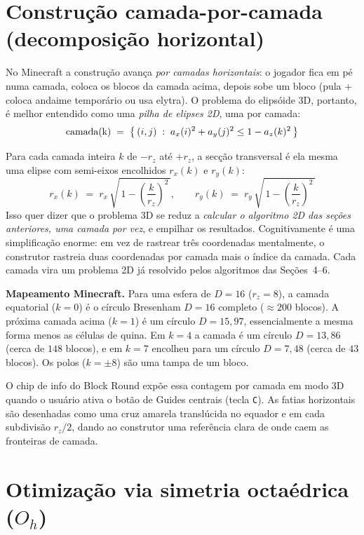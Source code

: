 \documentclass[12pt,a4paper]{scrartcl}
\newcommand{\code}[1]{\texttt{\small #1}}
\begin{document}
\section{Construção camada-por-camada (decomposição horizontal)}

No Minecraft a construção avança \emph{por camadas horizontais}: o jogador fica em pé numa camada, coloca os blocos da camada acima, depois sobe um bloco (pula + coloca andaime temporário ou usa elytra). O problema do elipsóide 3D, portanto, é melhor entendido como uma \emph{pilha de elipses 2D}, uma por camada:
\[
\text{\text{camada}(k)} \;=\; \bigl\{\,(i,j)\;:\;a_x(i)^2 + a_y(j)^2 \leq 1 - a_z(k)^2\,\bigr\}
\]

Para cada camada inteira $k$ de $-r_z$ até $+r_z$, a secção transversal é ela mesma uma elipse com semi-eixos encolhidos $r_x(k)$ e $r_y(k)$:
\[
r_x(k) \;=\; r_x\,\sqrt{\,1 - \left(\dfrac{k}{r_z}\right)^{\!2}\,},
\qquad
r_y(k) \;=\; r_y\,\sqrt{\,1 - \left(\dfrac{k}{r_z}\right)^{\!2}\,}
\]
Isso quer dizer que o problema 3D se reduz a \emph{calcular o algoritmo 2D das seções anteriores, uma camada por vez}, e empilhar os resultados. Cognitivamente é uma simplificação enorme: em vez de rastrear três coordenadas mentalmente, o construtor rastreia duas coordenadas por camada mais o índice da camada. Cada camada vira um problema 2D já resolvido pelos algoritmos das Seções~4--6.

\begin{minec}
\textbf{Mapeamento Minecraft.} Para uma esfera de $D=16$ ($r_z = 8$), a camada equatorial ($k=0$) é o círculo Bresenham $D=16$ completo ($\approx 200$ blocos). A próxima camada acima ($k=1$) é um círculo $D=15{,}97$, essencialmente a mesma forma menos as células de quina. Em $k=4$ a camada é um círculo $D=13{,}86$ (cerca de $148$ blocos), e em $k=7$ encolheu para um círculo $D=7{,}48$ (cerca de $43$ blocos). Os polos ($k = \pm 8$) são uma tampa de um bloco.
\end{minec}

O chip de info do Block Round expõe essa contagem por camada em modo 3D quando o usuário ativa o botão de Guides centrais (tecla \code{C}). As fatias horizontais são desenhadas como uma cruz amarela translúcida no equador e em cada subdivisão $r_z/2$, dando ao construtor uma referência clara de onde caem as fronteiras de camada.

\section{Otimização via simetria octaédrica ($O_h$)}
\end{document}
